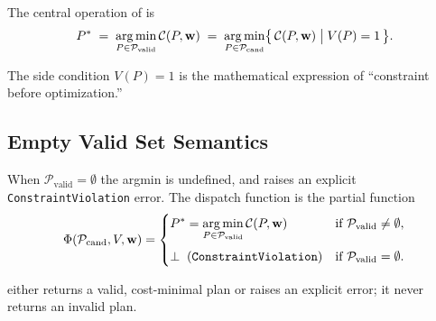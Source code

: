 The central operation of \gate{} is
\begin{equation}
P^{*} \;=\; \operatorname*{arg\,min}_{P \in \mathcal{P}_{\text{valid}}}
            \mathcal{C}(P, \mathbf{w})
      \;=\; \operatorname*{arg\,min}_{P \in \mathcal{P}_{\text{cand}}}
            \bigl\{\, \mathcal{C}(P, \mathbf{w}) \;\big|\; V(P) = 1 \,\bigr\}.
\label{eq:selection}
\end{equation}

The side condition $V(P) = 1$ is the mathematical expression of
``constraint before optimization.''

\subsection{Empty Valid Set Semantics}

When $\mathcal{P}_{\text{valid}} = \emptyset$ the argmin is undefined,
and \gate{} raises an explicit \texttt{ConstraintViolation} error. The
dispatch function is the partial function
\begin{equation}
\Phi(\mathcal{P}_{\text{cand}}, V, \mathbf{w}) =
\begin{cases}
\displaystyle P^{*} = \operatorname*{arg\,min}_{P \in \mathcal{P}_{\text{valid}}}
  \mathcal{C}(P, \mathbf{w})
  & \text{if } \mathcal{P}_{\text{valid}} \neq \emptyset, \\[1.2em]
\bot \;\; (\texttt{ConstraintViolation})
  & \text{if } \mathcal{P}_{\text{valid}} = \emptyset.
\end{cases}
\end{equation}

\gate{} either returns a valid, cost-minimal plan or raises an explicit
error; it never returns an invalid plan.
